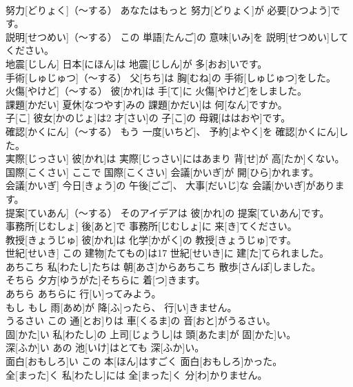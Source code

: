 \documentclass[8pt]{extreport}
\begin{document}
\begin{CJK}{UTF8}{min}
\\	努力[どりょく]（～する）	あなたはもっと 努力[どりょく]が 必要[ひつよう]です。		
\\	説明[せつめい]（～する）	この 単語[たんご]の 意味[いみ]を 説明[せつめい]してください。		
\\	地震[じしん]	日本[にほん]は 地震[じしん]が 多[おお]いです。		
\\	手術[しゅじゅつ]（～する）	父[ちち]は 胸[むね]の 手術[しゅじゅつ]をした。		
\\	火傷[やけど]（～する）	彼[かれ]は 手[て]に 火傷[やけど]をしました。		
\\	課題[かだい]	夏休[なつやす]みの 課題[かだい]は 何[なん]ですか。		
\\	子[こ]	彼女[かのじょ]は2 才[さい]の 子[こ]の 母親[ははおや]です。		
\\	確認[かくにん]（～する）	もう 一度[いちど]、 予約[よやく]を 確認[かくにん]した。		
\\	実際[じっさい]	彼[かれ]は 実際[じっさい]にはあまり 背[せ]が 高[たか]くない。		
\\	国際[こくさい]	ここで 国際[こくさい] 会議[かいぎ]が 開[ひら]かれます。		
\\	会議[かいぎ]	今日[きょう]の 午後[ごご]、 大事[だいじ]な 会議[かいぎ]があります。		
\\	提案[ていあん]（～する）	そのアイデアは 彼[かれ]の 提案[ていあん]です。		
\\	事務所[じむしょ]	後[あと]で 事務所[じむしょ]に 来[き]てください。		
\\	教授[きょうじゅ]	彼[かれ]は 化学[かがく]の 教授[きょうじゅ]です。		
\\	世紀[せいき]	この 建物[たてもの]は17 世紀[せいき]に 建[た]てられました。		
\\	あちこち	私[わたし]たちは 朝[あさ]からあちこち 散歩[さんぽ]しました。		
\\	そちら	夕方[ゆうがた]そちらに 着[つ]きます。		
\\	あちら	あちらに 行[い]ってみよう。		
\\	もし	もし 雨[あめ]が 降[ふ]ったら、 行[い]きません。		
\\	うるさい	この 通[とお]りは 車[くるま]の 音[おと]がうるさい。		
\\	固[かた]い	私[わたし]の 上司[じょうし]は 頭[あたま]が 固[かた]い。		
\\	深[ふか]い	あの 池[いけ]はとても 深[ふか]い。		
\\	面白[おもしろ]い	この 本[ほん]はすごく 面白[おもしろ]かった。		
\\	全[まった]く	私[わたし]には 全[まった]く 分[わ]かりません。		

\end{CJK}
\end{document}
